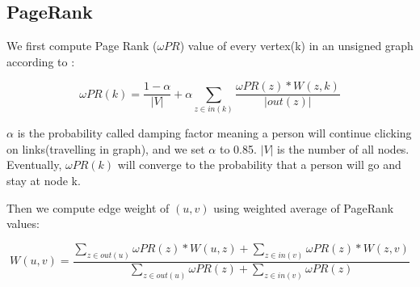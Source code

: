 
\subsection{PageRank}

We first compute Page Rank ($\omega PR$) value of every vertex(k) in an unsigned graph according to \cite{brin1998anatomy}:

\begin{equation}
\omega PR(k) = \frac{1 - \alpha}{\left | V \right|} + \alpha \sum_{z\in in(k)}\frac{\omega PR(z) * W(z,k)}{\left | out(z) \right |}
\end{equation}

$\alpha$ is the probability called damping factor meaning a person will continue clicking on links(travelling in graph), and we set $\alpha$ to 0.85. $\left |V\right |$ is the number of all nodes. Eventually, $\omega PR(k)$ will converge to the probability that a person will go and stay at node k.

Then we compute edge weight of $(u,v)$ using weighted average of PageRank values:

\begin{equation}
W(u,v) = \frac{\sum_{z\in out(u)} \omega PR(z)*W(u,z) + \sum_{z\in in(v)} \omega PR(z)*W(z,v)}
{\sum_{z\in out(u)}\omega PR(z) + \sum_{z\in in(v)}\omega PR(z)}
\end{equation}

